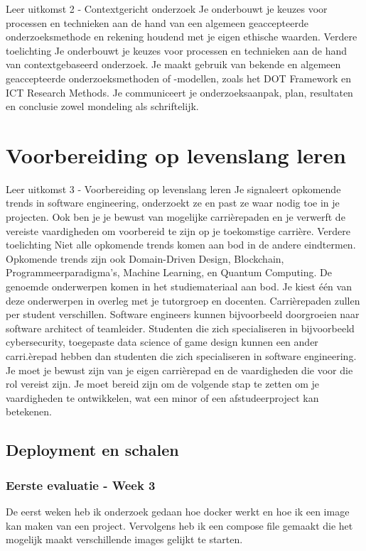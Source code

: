 Leer uitkomst 2 - Contextgericht onderzoek Je onderbouwt je keuzes voor processen en technieken aan de hand van een algemeen geaccepteerde onderzoeksmethode en rekening houdend met je eigen ethische waarden.
Verdere toelichting Je onderbouwt je keuzes voor processen en technieken aan de hand van contextgebaseerd onderzoek.
Je maakt gebruik van bekende en algemeen geaccepteerde onderzoeksmethoden of -modellen, zoals het DOT Framework en ICT Research Methods.
Je communiceert je onderzoeksaanpak, plan, resultaten en conclusie zowel mondeling als schriftelijk.





\section{Voorbereiding op levenslang leren}\label{sec:voorbereiding-op-levenslang-leren}
Leer uitkomst 3 - Voorbereiding op levenslang leren Je signaleert opkomende trends in software engineering, onderzoekt ze en past ze waar nodig toe in je projecten.
Ook ben je je bewust van mogelijke carrièrepaden en je verwerft de vereiste vaardigheden om voorbereid te zijn op je toekomstige carrière.
Verdere toelichting Niet alle opkomende trends komen aan bod in de andere eindtermen.
Opkomende trends zijn ook Domain-Driven Design, Blockchain, Programmeerparadigma's, Machine Learning, en Quantum Computing.
De genoemde onderwerpen komen in het studiemateriaal aan bod.
Je kiest één van deze onderwerpen in overleg met je tutorgroep en docenten.
Carrièrepaden zullen per student verschillen.
Software engineers kunnen bijvoorbeeld doorgroeien naar software architect of teamleider.
Studenten die zich specialiseren in bijvoorbeeld cybersecurity, toegepaste data science of game design kunnen een ander carri.èrepad hebben dan studenten die zich specialiseren in software engineering.
Je moet je bewust zijn van je eigen carrièrepad en de vaardigheden die voor die rol vereist zijn.
Je moet bereid zijn om de volgende stap te zetten om je vaardigheden te ontwikkelen, wat een minor of een afstudeerproject kan betekenen.

\subsection{Deployment en schalen}\label{subsec:deployen-en-schalen}
	\subsubsection{Eerste evaluatie - Week 3}\label{subsubsec:eerste-evaluatie---week-3}
	De eerst weken heb ik onderzoek gedaan hoe docker werkt en hoe ik een image kan maken van een project.
	Vervolgens heb ik een compose file gemaakt die het mogelijk maakt verschillende images gelijkt te starten.

